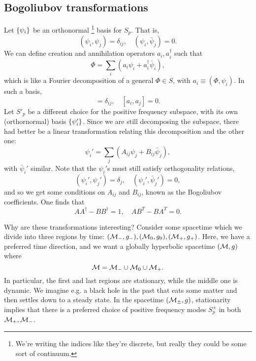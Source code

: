 \subsection*{Bogoliubov transformations}
Let $\{\psi_i\}$ be an orthonormal%
    \footnote{We're writing the indices like they're discrete, but really they could be some sort of continuum.}
basis for $S_p$. That is,
\begin{equation}
    (\psi_i, \psi_j) = \delta_{ij}, \quad (\psi_i, \bar \psi_j)=0.
\end{equation}
We can define creation and annihilation operators $a_i,a_i^\dagger$ such that
\begin{equation}
    \Phi = \sum_i (a_i \psi_i + a_i^\dagger \bar \psi_i),
\end{equation}
which is like a Fourier decomposition of a general $\Phi\in S$, with $a_i \equiv (\Phi,\psi_i)$. In such a basis,
\begin{equation}
    [a_i, a_j^\dagger] = \delta_{ij},\quad [a_i,a_j]=0.
\end{equation}
Let $S'_p$ be a different choice for the positive frequency subspace, with its own (orthornormal) basis $\{\psi_i'\}$. Since we are still decomposing the subspace, there had better be a linear transformation relating this decomposition and the other one:
\begin{equation}
     \psi_i' = \sum_j (A_{ij} \psi_j +B_{ij} \bar \psi_j),
\end{equation}
with $\bar \psi_i'$ similar. Note that the $\psi_i'$s must still satisfy orthogonality relations,
\begin{equation}
    (\psi_i', \psi_j')=\delta_{j},\quad (\psi_i',\bar \psi_j')=0,
\end{equation}
and so we get some conditions on $A_{ij}$ and $B_{ij}$, known as the Bogoliubov coefficients. One finds that
\begin{equation}
     A A^\dagger - B B^\dagger =1 , \quad A B^T - BA^T=0.
\end{equation}

Why are these transformations interesting? Consider some spacetime which we divide into three regions by time: $(\mathcal{M}_-,g_-),(\mathcal{M}_0,g_0),(\mathcal{M}_+,g_+)$. Here, we have a preferred time direction, and we want a globally hyperbolic spacetime $(\mathcal{M},g)$ where
\begin{equation}
     \mathcal{M} = \mathcal{M}_- \cup \mathcal{M}_0 \cup \mathcal{M}_+.
\end{equation}
In particular, the first and last regions are stationary, while the middle one is dynamic. We imagine e.g. a black hole in the past that eats some matter and then settles down to a steady state. In the spacetime $(\mathcal{M}_\pm,g)$, stationarity implies that there is a preferred choice of positive frequency modes $S^\pm_p$ in both $\mathcal{M}_+,\mathcal{M}_-$.

